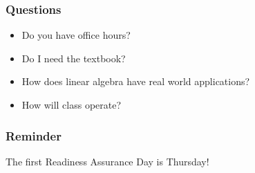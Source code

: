 \documentclass[aspectratio=1610]{beamer}
\begin{document}
\begin{frame}\frametitle{Questions}

\begin{itemize}
\item Do you have office hours?
\item Do I need the textbook?
\item How does linear algebra have real world applications?
\item How will class operate?
\end{itemize}
\end{frame}


\begin{frame}\frametitle{Reminder}
The first Readiness Assurance Day is Thursday!
\end{frame}
\end{document}
